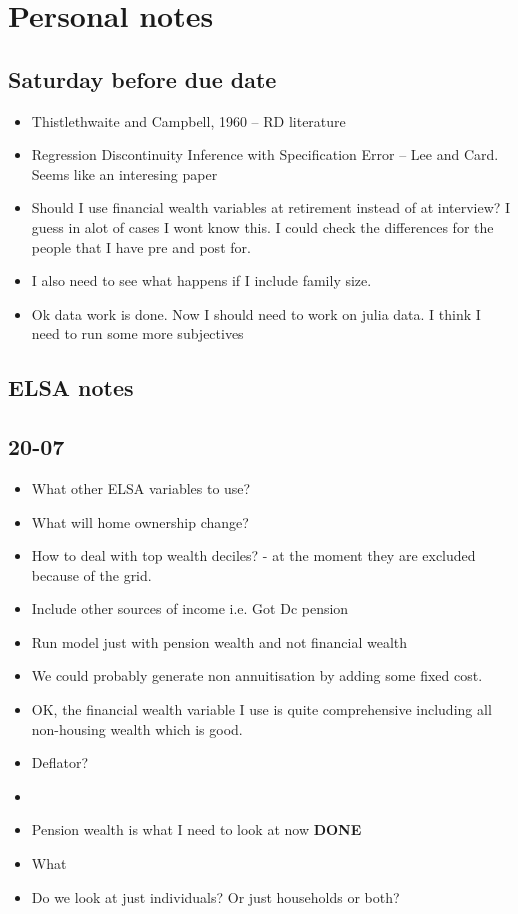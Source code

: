 \documentclass[12pt]{article}
\begin{document}
\section{Personal notes}

\subsection{Saturday before due date}
\begin{itemize}
  \item Thistlethwaite and Campbell, 1960 -- RD literature
  \item Regression Discontinuity Inference with Specification Error -- Lee and Card. Seems like an interesing paper
  \item Should I use financial wealth variables at retirement instead of at interview? I guess in alot of cases I wont
        know this. I could check the differences for the people that I have pre and post for.
  \item I also need to see what happens if I include family size.
  \item Ok data work is done. Now I should need to work on julia data. I think I need to run some more subjectives
\end{itemize}

\subsection{ELSA notes}
\subsection{\textbf{20-07}}
\begin{itemize}
  \item What other ELSA variables to use?
  \item What will home ownership change?
  \item How to deal with top wealth deciles? - at the moment they are excluded because of the grid.
  \item Include other sources of income i.e. Got Dc pension
  \item Run model just with pension wealth and not financial wealth
  \item We could probably generate non annuitisation by adding some fixed cost.
  \item OK, the financial wealth variable I use is quite comprehensive including all non-housing
        wealth which is good.
  \item Deflator?
  \item

  \item Pension wealth is what I need to look at now \textbf{DONE}
  \item What
  \item Do we look at just individuals? Or just households or both?
\end{itemize}
\end{document}
